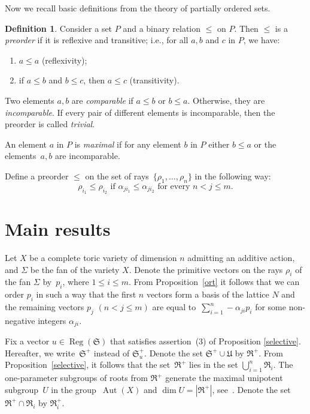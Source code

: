 \documentclass[a4paper,reqno,12pt]{amsart}
\DeclareMathOperator {\dimm}{dim}
\DeclareMathOperator {\Aut}{Aut}
\DeclareMathOperator {\Reg}{Reg}
\theoremstyle{definition}
\newtheorem{defn}{Definition}
\begin{document}
Now we recall basic definitions from the theory of partially ordered sets.
\begin{defn}
  Consider a set $P$ and a binary relation $\leq$ on $P$. Then $\leq$ is a \emph{preorder} if it is reflexive and transitive; i.e., for all $a, b$ and $c$ in $P$, we have:
  \begin{enumerate}
  \item $a \leq a$ (reflexivity);
  \item    if $a \leq b$ and $b \leq c$, then $a \leq c$ (transitivity).
  \end{enumerate}
  Two elements $a, b$ are \emph{comparable} if $a \leq b$ or $b \leq a$.
  Otherwise, they are \emph{incomparable}.
  If every pair of different elements is incomparable, then the preorder is called \emph{trivial}.

  An element $a$ in $P$ is \emph{maximal} if for any element $b$ in $P$ either $b\leq a$ or the elements~$a,b$ are incomparable.
\end{defn}
Define a preorder $\leq$ on the set of rays~${\{\rho_1, \ldots, \rho_n\}}$ in the following way:
\[{\rho_{i_1} \leq \rho_{i_2}}\text{ if } {\alpha_{ji_1}\leq \alpha_{ji_2}}\text{ for  every } {n < j\leq m}.\]
\section{Main results}\label{mainsection}
Let $X$ be a complete toric variety of dimension $n$ admitting an additive action, and $\Sigma$ be the fan of the variety $X$.
Denote the primitive vectors on the rays $\rho_i$ of the fan $\Sigma$ by~$p_i$, where $1 \leq i \leq m$.
From Proposition~\ref{ort} it follows that we can order $p_i$ in such a way that the first $n$ vectors form a basis of the lattice $N$ and the remaining vectors $p_j$ $(n < j \leq m)$ are equal to~$\sum_{i=1}^n-\alpha_{ji} p_i$ for some non-negative integers $\alpha_{ji}$.

  Fix a vector $u \in \Reg(\mathfrak S)$ that satisfies assertion~(3) of Proposition \ref{selective}.
  Hereafter, we write~$\mathfrak S^+$ instead of $\mathfrak S^+_{u}$.
  Denote the set $\mathfrak S^+ \cup \mathfrak U$ by $\mathfrak R^+$.
  From Proposition~\ref{selective}, it follows that the set~$\mathfrak R^+$ lies in the set $\bigcup\limits_{i=1}^n\mathfrak R_i$.
  The one-parameter subgroups of roots from $\mathfrak R^+$ generate the maximal unipotent subgroup~$U$ in the group~$\Aut(X)$ and $\dimm U = |\mathfrak{R}^+|$, see~\cite[Proposition~4.3]{Cox}.
Denote the set ${\mathfrak R^+ \cap \mathfrak R_i}$ by $\mathfrak R^+_i$.
\end{document}
